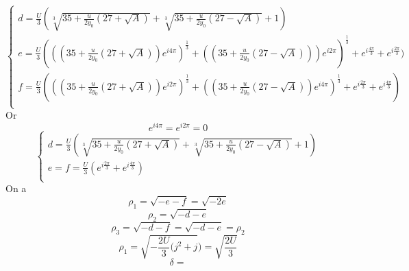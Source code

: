 \documentclass[12pt]{article}
\begin{document}
\begin{equation}
\left\{ \begin{array}{rl}
d = \frac{U}{3} ( \sqrt[3]{35+\frac{u}{2y_0}(27 + \sqrt{A})}+\sqrt[3]{35+\frac{u}{2y_0}(27 - \sqrt{A})} + 1)\\
e = \frac{U}{3} (((35+\frac{u}{2y_0}(27 + \sqrt{A})) e^{i4\pi})^{\frac{1}{3}} + ((35+\frac{u}{2y_0}(27 - \sqrt{A})))e^{i 2\pi})^{\frac{1}{3}}
+ e^{i\frac{4\pi}{3}} + e^{i\frac{2\pi}{3}} )\\
f = \frac{U}{3} (((35+\frac{u}{2y_0}(27 + \sqrt{A})) e^{i2\pi})^{\frac{1}{3}} + ((35+\frac{u}{2y_0}(27 - \sqrt{A}))e^{i 4\pi})^{\frac{1}{3}} 
+ e^{i\frac{2\pi}{3}} + e^{i\frac{4\pi}{3}} )\\
\end{array} \right.
\end{equation}
Or
\begin{equation}
 e^{i4\pi} = e^{i2\pi} = 0
\end{equation}
\begin{equation}
\left\{ \begin{array}{rl}
d = \frac{U}{3} ( \sqrt[3]{35+\frac{u}{2y_0}(27 + \sqrt{A})}+\sqrt[3]{35+\frac{u}{2y_0}(27 - \sqrt{A})} + 1)\\
e = f = \frac{U}{3} (e^{i\frac{2\pi}{3}} + e^{i\frac{4\pi}{3}} )\\
\end{array} \right.
\end{equation}
On a 
\begin{equation}
 \rho_1 = \sqrt{-e-f} = \sqrt{-2e}
\end{equation}
\begin{equation}
 \rho_2 = \sqrt{-d-e}
\end{equation}
\begin{equation}
 \rho_3 = \sqrt{-d-f} = \sqrt{-d-e} = \rho_2
\end{equation}
\begin{equation}
 \rho_1 = \sqrt{-\frac{2U}{3}(j^2+j}) = \sqrt{\frac{2U}{3}}
\end{equation}
\begin{equation}
 \delta = 
\end{equation}
\end{document}
